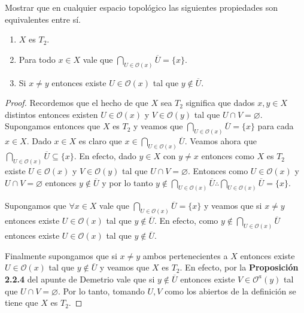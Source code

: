\documentclass{article}
\theoremstyle{definition}
\newenvironment{ejercicio}[1]{\begin{trivlist}
\item[\hskip \labelsep {\bfseries Ejercicio}\hskip \labelsep {\bfseries #1.}]}{\end{trivlist}}
\begin{document}
\begin{ejercicio}{2}
    Mostrar que en cualquier espacio topológico las siguientes propiedades son equivalentes entre sí.
    \begin{enumerate}
        \item \( X \) es \( T_{2} \).
        \item Para todo \( x\in X \) vale que \( \bigcap_{U\in\mathcal{O}(x)}\overline{U}=\{x\} \).
        \item Si \( x \neq y \) entonces existe \( U\in\mathcal{O}(x) \) tal que \( y\notin\overline{U} \).
    \end{enumerate}
\end{ejercicio}
\begin{proof}
    Recordemos que el hecho de que \( X \) sea \( T_2 \) significa que dados \( x, y \in X \) distintos entonces existen \( U \in \mathcal{O}(x) \) y \( V \in \mathcal{O}(y) \) tal que \( U \cap V = \varnothing \).
    Supongamos entonces que \( X \) es \( T_2 \) y veamos que \( \bigcap_{U \in \mathcal{O}(x)} \overline{U} = \{ x \} \) para cada \( x \in X \). Dado \( x \in X \) es claro que \( x \in \bigcap_{U \in \mathcal{O}(x)} \overline{U} \).
    Veamos ahora que \( \bigcap_{U \in \mathcal{O}(x)} \overline{U} \subseteq \{ x \} \). En efecto, dado \( y \in X \) con \( y \neq x \) entonces como \( X \) es \( T_2 \) existe \( U \in \mathcal{O}(x) \) y \( V \in \mathcal{O}(y) \) tal que \( U \cap V = \varnothing \).
    Entonces como \( U \in \mathcal{O}(x) \) y \( U \cap V = \varnothing \) entonces \( y \notin \overline{U} \) y por lo tanto \( y \notin \bigcap_{U \in \mathcal{O}(x)} \overline{U} \therefore \bigcap_{U \in \mathcal{O}(x)} \overline{U} = \{ x \} \).

    Supongamos que \( \forall x \in X \) vale que \( \bigcap_{U\in\mathcal{O}(x)}\overline{U}=\{x\} \) y veamos que si \( x \neq y \) entonces existe \( U\in\mathcal{O}(x) \) tal que \( y\notin\overline{U} \). En efecto,
    como \( y \notin \bigcap_{U \in \mathcal{O}(x)} \overline{U} \) entonces existe \( U \in \mathcal{O}(x) \) tal que \( y \notin \overline{U} \).

    Finalmente supongamos que si \( x \neq y \) ambos pertenecientes a \( X \) entonces existe \( U \in \mathcal{O}(x) \) tal que \( y \notin \overline{U} \) y veamos que \( X \) es \( T_2 \). En efecto, por la \textbf{Proposición 2.2.4} del apunte de Demetrio
    vale que si \( y \notin \overline{U} \) entonces existe \( V \in \mathcal{O}^a(y) \) tal que \( U \cap V = \varnothing \). Por lo tanto, tomando \( U, V \) como los abiertos de la definición se tiene que \( X \) es \( T_2 \).
\end{proof}
\end{document}

